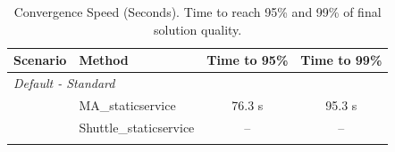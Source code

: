 \begin{table}[h]
\centering
\caption{Convergence Speed (Seconds). Time to reach 95\% and 99\% of final solution quality.}
\label{tab:convergence}
\begin{tabular}{llcc}
\toprule
\textbf{Scenario} & \textbf{Method} & \textbf{Time to 95\%} & \textbf{Time to 99\%} \\
\midrule
\multicolumn{4}{l}{\textit{Default - Standard}} \\
 & MA_staticservice & 76.3 s & 95.3 s \\
 & Shuttle_staticservice & -- & -- \\
\addlinespace
\bottomrule
\end{tabular}
\end{table}